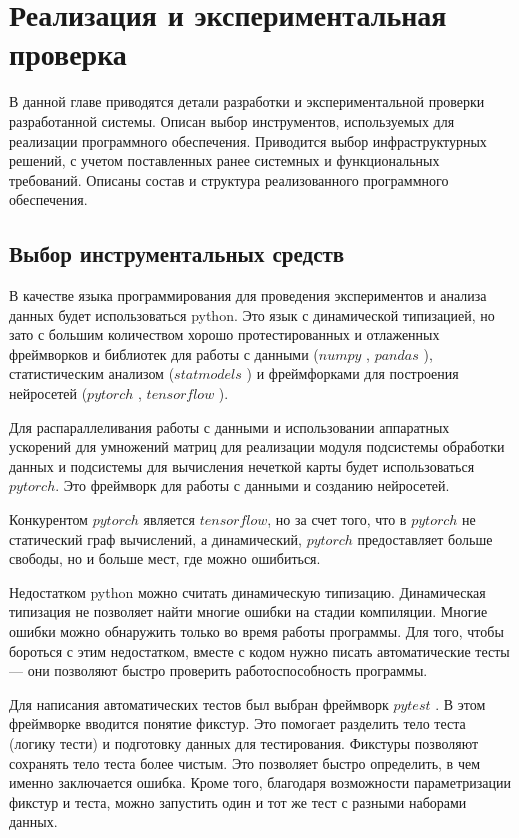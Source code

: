 \chapter{Реализация и экспериментальная проверка}

\begin{annotation}
	В данной главе приводятся детали разработки и экспериментальной проверки
	разработанной системы. Описан выбор инструментов, используемых для реализации
	программного обеспечения. Приводится выбор инфраструктурных решений,
	с учетом поставленных ранее системных и функциональных требований.
	Описаны состав и структура реализованного программного обеспечения.
\end{annotation}


\section{Выбор инструментальных средств}

В качестве языка программирования для проведения экспериментов и анализа данных
будет использоваться python. Это язык с динамической типизацией, но зато с
большим количеством хорошо протестированных и отлаженных фреймворков и библиотек для работы
с данными ($numpy$ \cite{oliphant2006guide}, $pandas$ \cite{reback2020pandas}), статистическим анализом ($statmodels$ \cite{seabold2010statsmodels})
и фреймфорками для построения нейросетей ($pytorch$ \cite{NEURIPS2019_9015}, $tensorflow$ \cite{tensorflow2015-whitepaper} ).

Для распараллеливания работы с данными и использовании аппаратных ускорений для умножений матриц
для реализации модуля подсистемы обработки данных и подсистемы для вычисления нечеткой карты
будет использоваться $pytorch$. Это фреймворк для работы с данными и созданию нейросетей.

Конкурентом $pytorch$ является $tensorflow$, но за счет того, что в $pytorch$ не статический
граф вычислений, а динамический, $pytorch$ предоставляет больше свободы, но и больше мест,
где можно ошибиться.

Недостатком python можно считать динамическую типизацию. Динамическая типизация не позволяет
найти многие ошибки на стадии компиляции. Многие ошибки можно обнаружить только во время
работы программы. Для того, чтобы бороться с этим недостатком, вместе с кодом нужно писать
автоматические тесты --- они позволяют быстро проверить работоспособность программы.

Для написания автоматических тестов был выбран фреймворк $ pytest $ \cite{pytestx.y}. В этом фреймворке
вводится понятие фикстур. Это помогает разделить тело теста (логику тести) и
подготовку данных для тестирования. Фикстуры позволяют сохранять тело
теста более чистым. Это позволяет быстро определить, в чем именно заключается ошибка.
Кроме того, благодаря возможности параметризации фикстур и теста, можно
запустить один и тот же тест с разными наборами данных.

